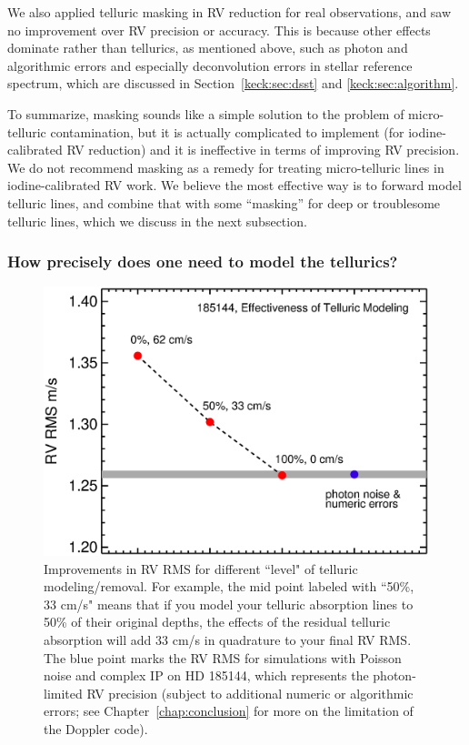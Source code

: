 We also applied telluric masking in RV reduction for real
observations, and saw no improvement over RV precision or
accuracy. This is because other effects dominate rather than
tellurics, as mentioned above, such as photon and algorithmic errors
and especially deconvolution errors in stellar reference spectrum,
which are discussed in Section~\ref{keck:sec:dsst} and
\ref{keck:sec:algorithm}.

To summarize, masking sounds like a simple solution to the problem of
micro-telluric contamination, but it is actually complicated to
implement (for iodine-calibrated RV reduction) and it is ineffective
in terms of improving RV precision. We do not recommend masking as a
remedy for treating micro-telluric lines in iodine-calibrated RV
work. We believe the most effective way is to forward model telluric
lines, and combine that with some ``masking'' for deep or troublesome
telluric lines, which we discuss in the next subsection.

\subsubsection{How precisely does one need to model the tellurics?}\label{keck:telluric:neid}


\begin{figure}
\includegraphics[scale=0.5]{telluric/neid.eps} 
\caption{Improvements in RV RMS for different ``level" of telluric
  modeling/removal. For example, the mid point labeled with ``50\%, 33 cm/s"
  means that if you model your telluric absorption lines to 50\% of
  their original depths, the effects of the residual telluric
  absorption will add 33 cm/s in quadrature to your final RV RMS. The
  blue point marks the RV RMS for simulations with Poisson noise and
  complex IP on HD 185144, which represents the photon-limited RV
  precision (subject to additional numeric or algorithmic errors; see
  Chapter~\ref{chap:conclusion} for more on the limitation of the
  Doppler code).
\label{telluric:fig:neid}}
\end{figure}


